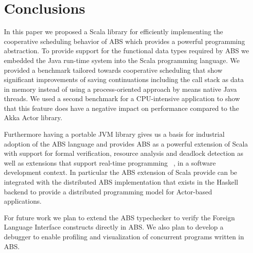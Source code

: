 \section{Conclusions}
\label{conc}
In this paper we proposed a Scala library for efficiently implementing the cooperative scheduling behavior of ABS which provides a powerful programming abstraction. To provide support for the functional data types required by ABS we embedded the Java run-time system into the Scala programming language. We provided a benchmark tailored towards cooperative scheduling that show significant improvements of saving continuations including the call stack as data in memory instead of using a process-oriented approach by means native Java threads. We used a second benchmark for a CPU-intensive application to show that this feature does have a negative impact on performance compared to the Akka Actor library.
\par Furthermore having a portable JVM library gives us a basis for industrial adoption of the ABS language and provides ABS as a powerful extension of Scala with support for formal verification, resource analysis and deadlock detection as well as extensions that support real-time programming ~\cite{rabs}, in a software development context. In particular the ABS extension of Scala provide can be integrated with the distributed ABS implementation that exists in the Haskell backend \cite{cloud} to provide a distributed programming model for Actor-based applications.
\par For future work we plan to extend the ABS typechecker to verify the Foreign Language Interface constructs directly in ABS. We also plan to develop a debugger to enable profiling and visualization of concurrent programs written in ABS. 



